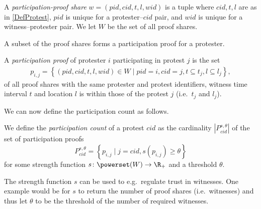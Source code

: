 \begin{frame}
\begin{definition}
  A \emph{participation-proof share} \(w = (pid, cid, t, l, wid)\) is a tuple 
  where
  \(cid, t, l\) are as in \cref{DefProtest},
  \(pid\) is unique for a protester--\(cid\) pair, and
  \(wid\) is unique for a witness--protester pair.
  We let \(W\) be the set of all proof shares.
\end{definition}
\end{frame}

A subset of the proof shares forms a participation proof for a protester.

\begin{frame}
\begin{definition}
  A \emph{participation proof} of protester \(i\) participating in protest \(j\) 
  is the set
  \begin{align}
    \nonumber
    p_{i, j} =
    \left\{ (pid, cid, t, l, wid)\in W \mid
    pid = i, cid = j,
    t \subseteq t_j, l\subseteq l_j \right\},
  \end{align}
  of all proof shares with the same protester and protest identifiers, witness 
  time interval \(t\) and location \(l\) is within those of the protest \(j\) 
  (i.e.\ \(t_j\) and \(l_j\)).
\end{definition}
\end{frame}

We can now define the participation count as follows.
\begin{frame}
\begin{definition}
  We define the \emph{participation count} of a protest \(cid\) as the 
  cardinality \(|P_{cid}^{s,\theta}|\) of the set of participation proofs \[
    P_{cid}^{s,\theta} = \left\{ p_{i,j} \mid
      j = cid, s(p_{i,j})\geq \theta \right\}
  \] for some strength function \(s\colon \powerset(W)\to \R_+\) and a threshold 
  \(\theta\).
\end{definition}

\pause{}

\end{frame}

The strength function \(s\) can be used to e.g.\ regulate trust in 
witnesses.
One example would be for \(s\) to return the number of proof shares (i.e.\ 
witnesses) and thus let \(\theta\) to be the threshold of the number of required 
witnesses.
